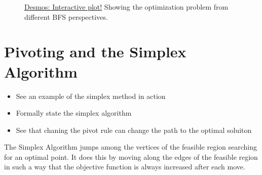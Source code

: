 \begin{figure}[h!]
\begin{center}
\end{center}
\caption{\href{https://www.desmos.com/calculator/j1li4l7lcv}{Desmos: Interactive plot!} Showing the optimization problem from different BFS perspectives.}
\end{figure}


\section{Pivoting and the Simplex Algorithm}
\begin{outcome}
\begin{itemize}
\item See an example of the simplex method in action
\item Formally state the simplex algorithm
\item See that chaning the pivot rule can change the path to the optimal soluiton
\end{itemize}
\end{outcome}
The Simplex Algorithm jumps among the vertices of the feasible region searching for an optimal point.
It does this by moving along the edges of the feasible region in such a way that the objective function is always increased after each move.

